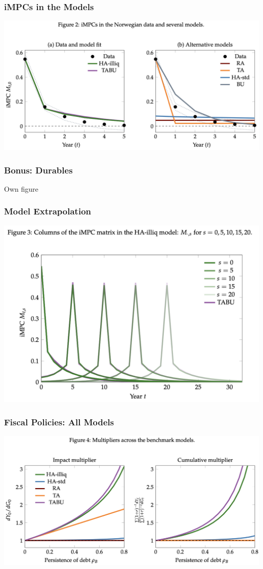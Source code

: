 \documentclass[english,xcolor=svgnames]{beamer}
\begin{document}
\begin{frame}
    \frametitle{iMPCs in the Models}
    \centering
    \includegraphics[scale=0.5]{figures/ARSFIG2.png}
\end{frame}

\begin{frame}
    \frametitle{Bonus: Durables}
    Own figure
\end{frame}

\begin{frame}
    \frametitle{Model Extrapolation}
    \centering
    \includegraphics[scale=0.5]{figures/ARSFIG3.png}
\end{frame}


\begin{frame}
    \frametitle{Fiscal Policies: All Models}
    \centering
    \includegraphics[scale=0.5]{figures/ARSFIG4.png}
\end{frame}
\end{document}
